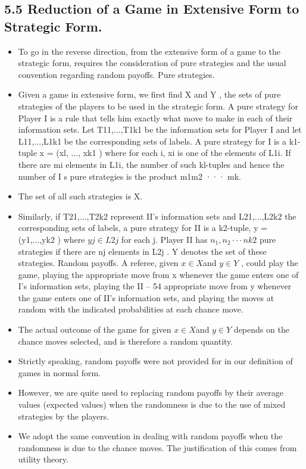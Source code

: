 \documentclass[]{report}
\begin{document}
\subsection{5.5 Reduction of a Game in Extensive Form to Strategic Form.}
\begin{itemize}
\item To go in
the reverse direction, from the extensive form of a game to the strategic form, requires the
consideration of pure strategies and the usual convention regarding random payoffs.
Pure strategies. \item Given a game in extensive form, we first find X and Y , the sets of
pure strategies of the players to be used in the strategic form. A pure strategy for Player
I is a rule that tells him exactly what move to make in each of their information sets. Let
T11,...,T1k1 be the information sets for Player I and let L11,...,L1k1 be the corresponding
sets of labels. A pure strategy for I is a k1-tuple x = (xl, ..., xk1 ) where for each i, xi is one
of the elements of L1i. If there are mi elements in L1i, the number of such kl-tuples and
hence the number of I s pure strategies is the product m1m2 ··· mk. \item The set of all such
strategies is X. \item Similarly, if T21,...,T2k2 represent II’s information sets and L21,...,L2k2
the corresponding sets of labels, a pure strategy for II is a k2-tuple, y = (y1,...,yk2 ) where
$yj \in L2j$ for each j. Player II has $n_1,n_2 ··· nk2$ pure strategies if there are nj elements in
L2j . Y denotes the set of these strategies.
Random payoffs. A referee, given $x \in X $and $y \in Y $ , could play the game, playing the
appropriate move from x whenever the game enters one of I’s information sets, playing the
II – 54
appropriate move from y whenever the game enters one of II’s information sets, and playing
the moves at random with the indicated probabilities at each chance move. 
\item The actual
outcome of the game for given $x \in X $and $y \in Y $ depends on the chance moves selected,
and is therefore a random quantity. \item Strictly speaking, random payoffs were not provided
for in our definition of games in normal form. \item However, we are quite used to replacing
random payoffs by their average values (expected values) when the randomness is due to
the use of mixed strategies by the players.\item  We adopt the same convention in dealing with
random payoffs when the randomness is due to the chance moves. The justification of this
comes from utility theory.
\end{itemize}
\end{document}
